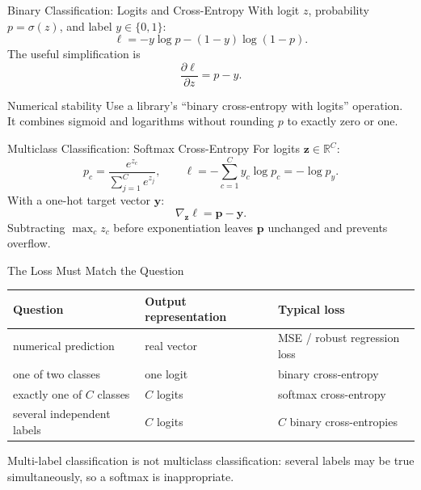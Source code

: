 \documentclass[10pt,aspectratio=169]{ntuabeamer}
\begin{document}
\begin{frame}{Binary Classification: Logits and Cross-Entropy}
  With logit $z$, probability $p=\sigma(z)$, and label $y\in\{0,1\}$:
  \[
    \ell=-y\log p-(1-y)\log(1-p).
  \]
  The useful simplification is
  \[
    \frac{\partial\ell}{\partial z}=p-y.
  \]
  \begin{block}{Numerical stability}
    Use a library's ``binary cross-entropy with logits'' operation. It combines sigmoid and logarithms without rounding $p$ to exactly zero or one.
  \end{block}
\end{frame}

\begin{frame}{Multiclass Classification: Softmax Cross-Entropy}
  For logits $\mathbf z\in\mathbb R^C$:
  \[
    p_c=\frac{e^{z_c}}{\sum_{j=1}^{C}e^{z_j}},
    \qquad
    \ell=-\sum_{c=1}^{C}y_c\log p_c=-\log p_{y}.
  \]
  With a one-hot target vector $\mathbf y$:
  \[
    \nabla_{\mathbf z}\ell=\mathbf p-\mathbf y.
  \]
  Subtracting $\max_c z_c$ before exponentiation leaves $\mathbf p$ unchanged and prevents overflow.
\end{frame}

\begin{frame}{The Loss Must Match the Question}
  \centering
  \small
  \begin{tabular}{lll}
    \toprule
    Question & Output representation & Typical loss \\
    \midrule
    numerical prediction & real vector & MSE / robust regression loss \\
    one of two classes & one logit & binary cross-entropy \\
    exactly one of $C$ classes & $C$ logits & softmax cross-entropy \\
    several independent labels & $C$ logits & $C$ binary cross-entropies \\
    \bottomrule
  \end{tabular}
  \par
  \vspace{0.4cm}
  Multi-label classification is not multiclass classification: several labels may be true simultaneously, so a softmax is inappropriate.
\end{frame}

\end{document}
